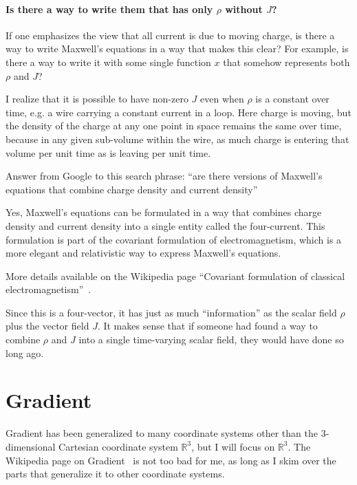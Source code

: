 \documentclass[a4paper]{article}
\theoremstyle{plain}
\theoremstyle{definition}
\begin{document}
\paragraph{Is there a way to write them that has only $\rho$ without $J$?}

If one emphasizes the view that all current is due to moving charge,
is there a way to write Maxwell's equations in a way that makes this
clear?  For example, is there a way to write it with some single
function $x$ that somehow represents both $\rho$ and $J$?

I realize that it is possible to have non-zero $J$ even when $\rho$ is
a constant over time, e.g. a wire carrying a constant current in a
loop.  Here charge is moving, but the density of the charge at any one
point in space remains the same over time, because in any given
sub-volume within the wire, as much charge is entering that volume per
unit time as is leaving per unit time.

Answer from Google to this search phrase: ``are there versions of
Maxwell's equations that combine charge density and current density''

Yes, Maxwell's equations can be formulated in a way that combines
charge density and current density into a single entity called the
four-current.  This formulation is part of the covariant formulation
of electromagnetism, which is a more elegant and relativistic way to
express Maxwell's equations.

More details available on the Wikipedia page ``Covariant formulation
of classical
electromagnetism''~\cite{CovariantFormulationOfClassicalElectromagnetism}.

Since this is a four-vector, it has just as much ``information'' as
the scalar field $\rho$ plus the vector field $J$.  It makes sense
that if someone had found a way to combine $\rho$ and $J$ into a
single time-varying scalar field, they would have done so long ago.


\section{Gradient}
\label{sec:gradient}

Gradient has been generalized to many coordinate systems other than
the 3-dimensional Cartesian coordinate system $\mathbb{R}^3$, but I
will focus on $\mathbb{R}^3$.  The Wikipedia page on
Gradient~\cite{Gradient} is not too bad for me, as long as I skim over
the parts that generalize it to other coordinate systems.
\end{document}
